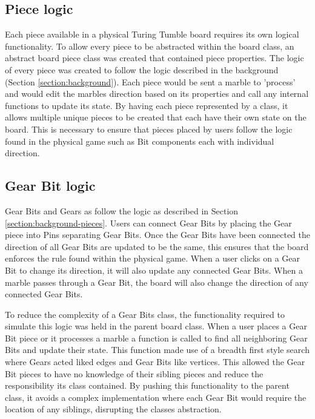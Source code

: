 \documentclass{l4proj}
\begin{document}
\subsection{Piece logic}
Each piece available in a physical Turing Tumble board requires its own logical functionality. To allow every piece to be abstracted within the board class, an abstract board piece class was created that contained piece properties. The logic of every piece was created to follow the logic described in the background (Section \ref{section:background}). Each piece would be sent a marble to 'process' and would edit the marbles direction based on its properties and call any internal functions to update its state. By having each piece represented by a class, it allows multiple unique pieces to be created that each have their own state on the board. This is necessary to ensure that pieces placed by users follow the logic found in the physical game such as Bit components each with individual direction.  


\subsection{Gear Bit logic}
Gear Bits and Gears as follow the logic as described in Section \ref{section:background-pieces}. Users can connect Gear Bits by placing the Gear piece into Pins separating Gear Bits. Once the Gear Bits have been connected the direction of all Gear Bits are updated to be the same, this ensures that the board enforces the rule found within the physical game. When a user clicks on a Gear Bit to change its direction, it will also update any connected Gear Bits. When a marble passes through a Gear Bit, the board will also change the direction of any connected Gear Bits.

To reduce the complexity of a Gear Bits class, the functionality required to simulate this logic was held in the parent board class. When a user places a Gear Bit piece or it processes a marble a function is called to find all neighboring Gear Bits and update their state. This function made use of a breadth first style search where Gears acted liked edges and Gear Bits like vertices. This allowed the Gear Bit pieces to have no knowledge of their sibling pieces and reduce the responsibility its class contained. By pushing this functionality to the parent class, it avoids a complex implementation where each Gear Bit would require the location of any siblings, disrupting the classes abstraction.
\end{document}
